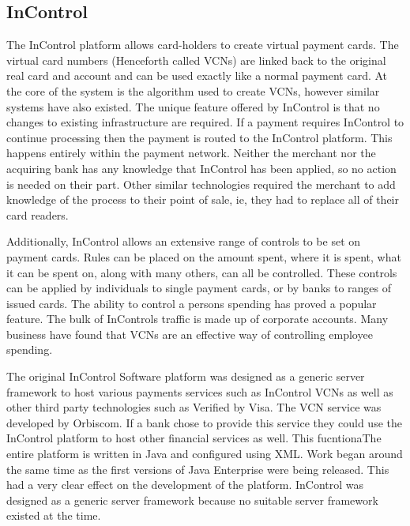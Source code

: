 \documentclass[a4paper, 11pt, titlepage]{article}
\begin{document}
\subsection{InControl}
The InControl platform allows card-holders to create virtual payment cards. The virtual card numbers (Henceforth called VCNs) are linked back to the original real card and account and can be used exactly like a normal payment card. At the core of the system is the algorithm used to create VCNs, however similar systems have also existed. The unique feature offered by InControl is that no changes to existing infrastructure are required. If a payment requires InControl to continue processing then the payment is routed to the InControl platform. This happens entirely within the payment network. Neither the merchant nor the acquiring bank has any knowledge that InControl has been applied, so no action is needed on their part. Other similar technologies required the merchant to add knowledge of the process to their point of sale, ie, they had to replace all of their card readers.

Additionally, InControl allows an extensive range of controls to be set on payment cards. Rules can be placed on the amount spent, where it is spent, what it can be spent on, along with many others, can all be controlled. These controls can be applied by individuals to single payment cards, or by banks to ranges of issued cards. The ability to control a persons spending has proved a popular feature. The bulk of InControls traffic is made up of corporate accounts. Many business have found that VCNs are an effective way of controlling employee spending. 

The original InControl Software platform was designed as a generic server framework to host various payments services such as InControl VCNs as well as other third party technologies such as Verified by Visa. The VCN service was developed by Orbiscom. If a bank chose to provide this service they could use the InControl platform to host other financial services as well. This fucntionaThe entire platform is written in Java and configured using XML. Work began around the same time as the first versions of Java Enterprise were being released. This had a very clear effect on the development of the platform. InControl was designed as a generic server framework because no suitable server framework existed at the time.
\end{document}
